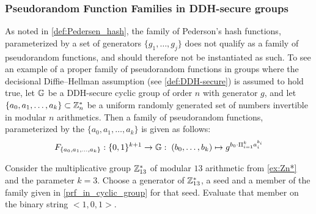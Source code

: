 \subsubsection{Pseudorandom Function Families in DDH-secure groups}
As noted in \ref{def:Pedersen_hash}, the family of Pederson's hash functions, parameterized by a set of generators $\{g_1,\ldots,g_j\}$ does not qualify as a family of pseudorandom functions, and should therefore not be instantiated as such. To see an example of a proper family of pseudorandom functions in groups where the decisional Diffie--Hellman assumption (see \secname \ref{def:DDH-secure}) is assumed to hold true, let $\mathbb{G}$ be a DDH-secure cyclic group of order $n$ with generator $g$, and let $\{a_0,a_1,\ldots,a_k\}\subset \mathbb{Z}_{n}^*$ be a uniform randomly generated set of numbers invertible in modular $n$ arithmetics. Then a family of pseudorandom functions, parameterized by the  $\{a_0,a_1,\ldots,a_k\}$ is given as follows:
\begin{equation}
\label{prf_in_cyclic_group}
F_{\{a_0,a_1,\ldots,a_k\}}: \{0,1\}^{k+1} \to \mathbb{G}:\; (b_0,\ldots,b_k)\mapsto g^{b_0\cdot \Pi_{i=1}^k a_i^{b_i}}
\end{equation}
\begin{exercise} Consider the multiplicative group $\mathbb{Z}_{13}^*$ of modular $13$ arithmetic from \examplename{} \ref{ex:Zn*} and the parameter $k=3$. Choose a generator of $\mathbb{Z}_{13}^*$, a seed and  a member of the family given in \eqref{prf_in_cyclic_group} for that seed. Evaluate that member on the binary string $<1,0,1>$.
\end{exercise}



